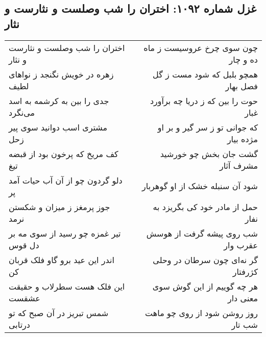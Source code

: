 \begin{center}
\section*{غزل شماره ۱۰۹۲: اختران را شب وصلست و نثارست و نثار}
\label{sec:1092}
\begin{longtable}{l p{0.5cm} r}
اختران را شب وصلست و نثارست و نثار
&&
چون سوی چرخ عروسیست ز ماه ده و چار
\\
زهره در خویش نگنجد ز نواهای لطیف
&&
همچو بلبل که شود مست ز گل فصل بهار
\\
جدی را بین به کرشمه به اسد می‌نگرد
&&
حوت را بین که ز دریا چه برآورد غبار
\\
مشتری اسب دوانید سوی پیر زحل
&&
که جوانی تو ز سر گیر و بر او مژده بیار
\\
کف مریخ که پرخون بود از قبضه تیغ
&&
گشت جان بخش چو خورشید مشرف آثار
\\
دلو گردون چو از آن آب حیات آمد پر
&&
شود آن سنبله خشک از او گوهربار
\\
جوز پرمغز ز میزان و شکستن نرمد
&&
حمل از مادر خود کی بگریزد به نفار
\\
تیر غمزه چو رسید از سوی مه بر دل قوس
&&
شب روی پیشه گرفت از هوسش عقرب وار
\\
اندر این عید برو گاو فلک قربان کن
&&
گر نه‌ای چون سرطان در وحلی کژرفتار
\\
این فلک هست سطرلاب و حقیقت عشقست
&&
هر چه گوییم از این گوش سوی معنی دار
\\
شمس تبریز در آن صبح که تو درتابی
&&
روز روشن شود از روی چو ماهت شب تار
\\
\end{longtable}
\end{center}
